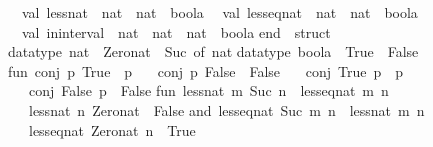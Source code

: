 \begin{isabellebody}
\begin{isamarkuptext}
\ \ val\ less{}nat\ {}\ nat\ {}{}\ nat\ {}{}\ boola\isanewline
\ \ val\ less{}eq{}nat\ {}\ nat\ {}{}\ nat\ {}{}\ boola\isanewline
\ \ val\ in{}interval\ {}\ nat\ {}\ nat\ {}{}\ nat\ {}{}\ boola\isanewline
end\ {}\ struct\isanewline
\isanewline
datatype\ nat\ {}\ Zero{}nat\ {}\ Suc\ of\ nat{}\isanewline
\isanewline
datatype\ boola\ {}\ True\ {}\ False{}\isanewline
\isanewline
fun\ conj\ p\ True\ {}\ p\isanewline
\ \ {}\ conj\ p\ False\ {}\ False\isanewline
\ \ {}\ conj\ True\ p\ {}\ p\isanewline
\ \ {}\ conj\ False\ p\ {}\ False{}\isanewline
\isanewline
fun\ less{}nat\ m\ {}Suc\ n{}\ {}\ less{}eq{}nat\ m\ n\isanewline
\ \ {}\ less{}nat\ n\ Zero{}nat\ {}\ False\isanewline
and\ less{}eq{}nat\ {}Suc\ m{}\ n\ {}\ less{}nat\ m\ n\isanewline
\ \ {}\ less{}eq{}nat\ Zero{}nat\ n\ {}\ True{}\isanewline

\end{isamarkuptext}
\end{isabellebody}
